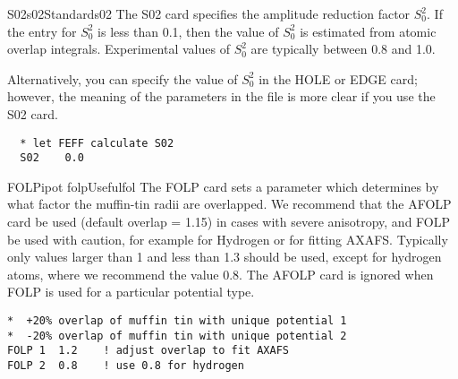 \documentclass[11pt,oneside]{report} %
\begin{document}
\begin{Card}{S02}{s02}{Standard}{s02}
  The S02 card specifies the amplitude reduction factor $S_0^2$. If
  the entry for $S_0^2$ is less than 0.1, then the value of $S_0^2$ is
  estimated from atomic overlap integrals.  Experimental values of
  $S_0^2$ are typically between 0.8 and 1.0.

  Alternatively, you can specify the value of $S_0^2$ in the HOLE or
  EDGE card; however, the meaning of the parameters in the
   file is more clear if you use the S02 card.
\begin{verbatim}
  * let FEFF calculate S02
  S02    0.0
\end{verbatim}
\end{Card}


\begin{Card}{FOLP}{ipot folp}{Useful}{fol}
  The FOLP card sets a parameter which determines by what factor the
  muffin-tin radii are overlapped.  We recommend that the AFOLP card
  be used (default overlap = 1.15) in cases with severe anisotropy,
  and FOLP be used with caution, for example for Hydrogen or for 
  fitting AXAFS.  Typically only values larger than 1 and less than 1.3
  should be used, except for hydrogen atoms, where we recommend
  the value 0.8. The AFOLP card is ignored when FOLP
  is used for  a particular potential type.
\begin{verbatim}
*  +20% overlap of muffin tin with unique potential 1
*  -20% overlap of muffin tin with unique potential 2
FOLP 1  1.2    ! adjust overlap to fit AXAFS
FOLP 2  0.8    ! use 0.8 for hydrogen
\end{verbatim}
\end{Card}
\end{document}
